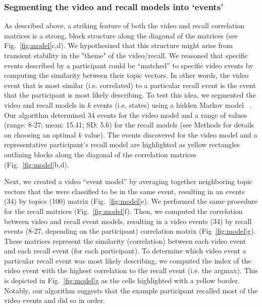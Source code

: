 \documentclass{article}
\begin{document}
{\subsubsection{Segmenting the video and recall models into `events'}
As described above, a striking feature of both the video and recall correlation matrices is a strong, block structure along the diagonal of the matrices (see Fig.~\ref{fig:model}c,d).  We hypothesized that this structure might arise from transient stability in the "theme" of the video/recall. We reasoned that specific events described by a participant could be ``matched'' to specific video events by computing the similarity between their topic vectors. In other words, the video event that is most similar (i.e. correlated) to a particular recall event is the event that the participant is most likely describing. To test this idea, we segmented the video and recall models in $k$ events (i.e. states) using a hidden Markov model ~\citep{BaldEtal17}. Our algorithm determined 34 events for the video model and a range of values (range: 8-27; mean: 15.41; SD: 5.6) for the recall models (see Methods for details on choosing an optimal $k$ value).  The events discovered for the video model and a representative participant's recall model are highlighted as yellow rectangles outlining blocks along the diagonal of the correlation matrices (Fig.~\ref{fig:model}b,d).

Next, we created a video ``event model'' by averaging together neighboring topic vectors that the were classified to be in the same event, resulting in an events (34) by topics (100) matrix (Fig.~\ref{fig:model}e).  We performed the same procedure for the recall matrices (Fig.~\ref{fig:model}f). Then, we computed the correlation between video and recall event models, resulting in a video events (34) by recall events (8-27, depending on the participant) correlation matrix (Fig~\ref{fig:model}g). These matrices represent the similarity (correlation) between each video event and each recall event (for each participant). To determine which video event a particular recall event was most likely describing, we computed the index of the video event with the highest correlation to the recall event (i.e. the argmax).  This is depicted in Fig.~\ref{fig:model}g as the cells highlighted with a yellow border. Notably, our algorithm suggests that the example participant recalled most of the video events and did so in order.

}
\end{document}
